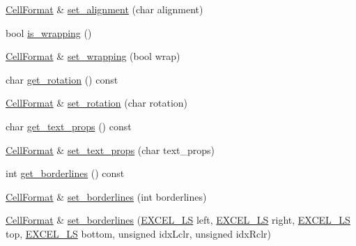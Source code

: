 \begin{DoxyCompactItemize}
\item 
\hyperlink{struct_excel_format_1_1_cell_format}{Cell\+Format} \& \hyperlink{struct_excel_format_1_1_cell_format_a4de90d5c3b6093581df4e93253f7e7fd}{set\+\_\+alignment} (char alignment)
\item 
bool \hyperlink{struct_excel_format_1_1_cell_format_ae982edb095d1a18b2c415a444ac64ec4}{is\+\_\+wrapping} ()
\item 
\hyperlink{struct_excel_format_1_1_cell_format}{Cell\+Format} \& \hyperlink{struct_excel_format_1_1_cell_format_a63101baf36c420d84d0637b4c1892e3b}{set\+\_\+wrapping} (bool wrap)
\item 
char \hyperlink{struct_excel_format_1_1_cell_format_a77cf40136e6c4b952a2a8fa6cd3e896d}{get\+\_\+rotation} () const 
\item 
\hyperlink{struct_excel_format_1_1_cell_format}{Cell\+Format} \& \hyperlink{struct_excel_format_1_1_cell_format_a092034fdd56421959ff1f5b62f48def7}{set\+\_\+rotation} (char rotation)
\item 
char \hyperlink{struct_excel_format_1_1_cell_format_a9205093a5e79bf88c12e44f5a29ce834}{get\+\_\+text\+\_\+props} () const 
\item 
\hyperlink{struct_excel_format_1_1_cell_format}{Cell\+Format} \& \hyperlink{struct_excel_format_1_1_cell_format_a10bec37cc0c639ba5101788e6e395d82}{set\+\_\+text\+\_\+props} (char text\+\_\+props)
\item 
int \hyperlink{struct_excel_format_1_1_cell_format_ad9ee83cc3d243323f5032638c63bdb3d}{get\+\_\+borderlines} () const 
\item 
\hyperlink{struct_excel_format_1_1_cell_format}{Cell\+Format} \& \hyperlink{struct_excel_format_1_1_cell_format_a9ae656edccfa8869fdf27f3ea87b212a}{set\+\_\+borderlines} (int borderlines)
\item 
\hyperlink{struct_excel_format_1_1_cell_format}{Cell\+Format} \& \hyperlink{struct_excel_format_1_1_cell_format_a3f1e70708c0836e8ab66df96b4fe58f3}{set\+\_\+borderlines} (\hyperlink{namespace_excel_format_af723db0cf2ef2243e273dcf782c51355}{E\+X\+C\+E\+L\+\_\+\+L\+S} left, \hyperlink{namespace_excel_format_af723db0cf2ef2243e273dcf782c51355}{E\+X\+C\+E\+L\+\_\+\+L\+S} right, \hyperlink{namespace_excel_format_af723db0cf2ef2243e273dcf782c51355}{E\+X\+C\+E\+L\+\_\+\+L\+S} top, \hyperlink{namespace_excel_format_af723db0cf2ef2243e273dcf782c51355}{E\+X\+C\+E\+L\+\_\+\+L\+S} bottom, unsigned idx\+Lclr, unsigned idx\+Rclr)
\item 

\end{DoxyCompactItemize}
